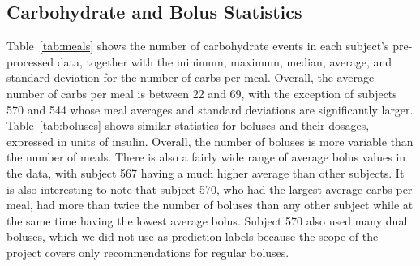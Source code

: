\documentclass[journal,article,submit,moreauthors,pdftex]{Definitions/mdpi}
\begin{document}
\subsection{Carbohydrate and Bolus Statistics}
\label{sec:statistics}

Table~\ref{tab:meals} shows the number of carbohydrate events in each subject's pre-processed data, together with the minimum, maximum, median, average, and standard deviation for the number of carbs per meal. Overall, the average number of carbs per meal is between 22 and 69, with the exception of subjects 570 and 544 whose meal averages and standard deviations are significantly larger. 
Table~\ref{tab:boluses} shows similar statistics for boluses and their dosages, expressed in units of insulin.
Overall, the number of boluses is more variable than the number of meals. There is also a fairly wide range of average bolus values in the data, with subject 567 having a much higher average than other subjects. It is also interesting to note that subject 570, who had the largest average carbs per meal, had more than twice the number of boluses than any other subject while at the same time having the lowest average bolus. Subject 570 also used many dual boluses, which we did not use as prediction labels because the scope of the project covers only recommendations for regular boluses.
\end{document}
